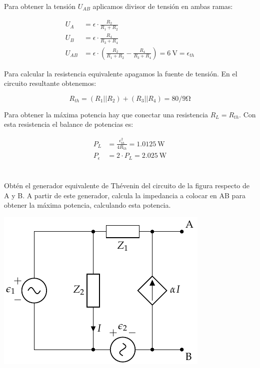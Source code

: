 \documentclass[12pt]{article}
\begin{document}
Para obtener la tensión $U_{AB}$ aplicamos divisor de tensión en ambas ramas:

\begin{align*}
  U_A &= \epsilon \cdot \frac{R_2}{R_1 + R_2}\\
  U_B &= \epsilon \cdot \frac{R_4}{R_3 + R_4}\\
  U_{AB} &= \epsilon \cdot (\frac{R_2}{R_1 + R_2} -  \frac{R_4}{R_3 + R_4}) = \SI{6}{\volt} = \epsilon_{th}
\end{align*}

Para calcular la resistencia equivalente apagamos la fuente de tensión. En el circuito resultante obtenemos:

\begin{equation*}
  R_{th} = (R_1 || R_2) + (R_3 || R_4) = 80/9\si{\ohm}
\end{equation*}

Para obtener la máxima potencia hay que conectar una resistencia $R_L = R_{th}$. Con esta resistencia el balance de potencias es:

\begin{align*}
  P_L &= \frac{\epsilon_{th}^2}{4R_{th}} = \SI{1.0125}{\watt}\\
    P_\epsilon &= 2 \cdot P_L = \SI{2.025}{\watt}
\end{align*}

\clearpage

\section{}

Obtén el generador equivalente de Thévenin del circuito de la figura respecto de A y B. A partir de este generador, calcula la impedancia a colocar en AB para obtener la máxima potencia, calculando esta potencia.

\begin{center}
\includegraphics{figs/Thevenin5}
\end{center}
\end{document}
